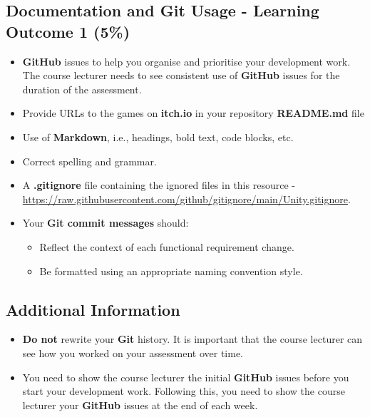 \documentclass{article}
\begin{document}
\subsection*{Documentation and Git Usage - Learning Outcome 1 (5\%)}
	\begin{itemize}
		\item \textbf{GitHub} issues to help you organise and prioritise your
			development work. The course lecturer needs to see consistent use of \textbf{GitHub}
			issues for the duration of the assessment.
		\item Provide URLs to the games on \textbf{itch.io} in your repository
			\textbf{README.md} file
		\item Use of \textbf{Markdown}, i.e., headings, bold text, code blocks, etc.    
		\item Correct spelling and grammar.
		\item A \textbf{.gitignore} file containing the ignored files in this
			resource -\\
			\href{https://raw.githubusercontent.com/github/gitignore/main/Unity.gitignore}{https://raw.githubusercontent.com/github/gitignore/main/Unity.gitignore}. 
		\item Your \textbf{Git commit messages} should:
			\begin{itemize}
				\item Reflect the context of each functional requirement change.
				\item Be formatted using an appropriate naming convention style.
			\end{itemize}
	\end{itemize}

	\subsection*{Additional Information}
	\begin{itemize}
		\item \textbf{Do not} rewrite your \textbf{Git} history. It is important
			that the course lecturer can see how you worked on your assessment over
			time.
		\item You need to show the course lecturer the initial \textbf{GitHub} issues before you start your development work. Following this,
			you need to show the course lecturer your \textbf{GitHub} 
			issues at the end of each week.
	\end{itemize}
\end{document}
